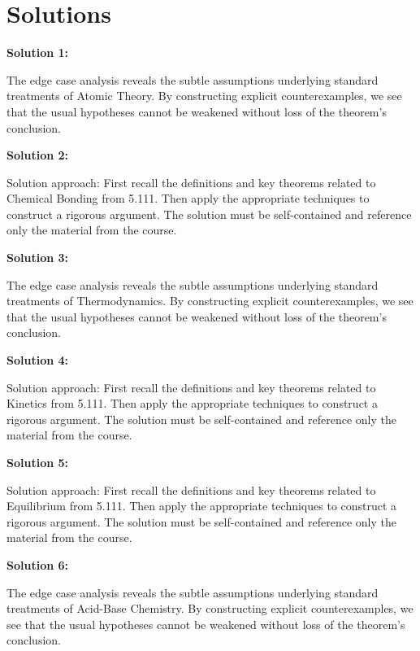 \documentclass[12pt,a4paper]{exam}
\begin{document}
\newpage
\section*{Solutions}

\textbf{Solution 1:}

The edge case analysis reveals the subtle assumptions underlying standard treatments of Atomic Theory. By constructing explicit counterexamples, we see that the usual hypotheses cannot be weakened without loss of the theorem's conclusion.

\vspace{0.5cm}

\textbf{Solution 2:}

Solution approach: First recall the definitions and key theorems related to Chemical Bonding from 5.111. Then apply the appropriate techniques to construct a rigorous argument. The solution must be self-contained and reference only the material from the course.

\vspace{0.5cm}

\textbf{Solution 3:}

The edge case analysis reveals the subtle assumptions underlying standard treatments of Thermodynamics. By constructing explicit counterexamples, we see that the usual hypotheses cannot be weakened without loss of the theorem's conclusion.

\vspace{0.5cm}

\textbf{Solution 4:}

Solution approach: First recall the definitions and key theorems related to Kinetics from 5.111. Then apply the appropriate techniques to construct a rigorous argument. The solution must be self-contained and reference only the material from the course.

\vspace{0.5cm}

\textbf{Solution 5:}

Solution approach: First recall the definitions and key theorems related to Equilibrium from 5.111. Then apply the appropriate techniques to construct a rigorous argument. The solution must be self-contained and reference only the material from the course.

\vspace{0.5cm}

\textbf{Solution 6:}

The edge case analysis reveals the subtle assumptions underlying standard treatments of Acid-Base Chemistry. By constructing explicit counterexamples, we see that the usual hypotheses cannot be weakened without loss of the theorem's conclusion.
\end{document}
